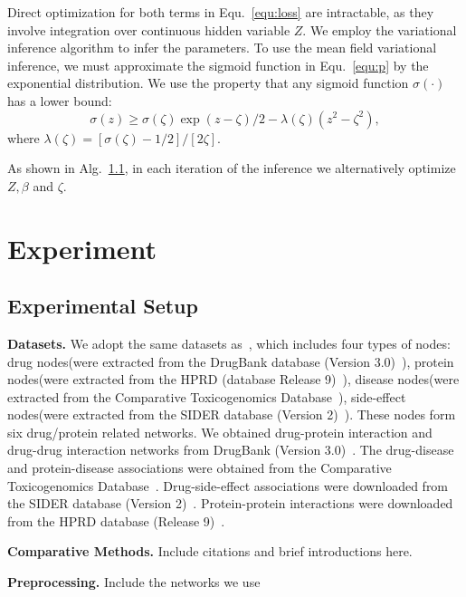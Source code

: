 \documentclass[sigconf,anonymous]{acmart}
\begin{document}
Direct optimization for both terms in Equ.~\ref{equ:loss} are intractable, as they involve integration over continuous hidden variable $Z$. We employ the variational inference algorithm to infer the parameters. To use the mean field variational inference, we must approximate the sigmoid function in Equ.~\ref{equ:p} by the exponential distribution. We use the property that any sigmoid function $\sigma(\cdot)$ has a lower bound: 
\begin{equation}
\sigma(z)\geq \sigma(\zeta)\exp{(z-\zeta)/2-\lambda(\zeta)(z^2-\zeta^2)},
\end{equation}  
where $\lambda(\zeta)=[\sigma(\zeta)-1/2]/[2\zeta]$. 

As shown in Alg.~\ref{}, in each iteration of the inference we alternatively optimize $Z,\beta$ and $\zeta$. 
\section{Experiment}\label{sec:experiment}
\subsection{Experimental Setup}

\textbf{Datasets.} %
We adopt the same datasets as~\cite{Luo2017Network}, which includes four types of nodes: drug nodes(were extracted from the DrugBank database (Version 3.0)~\cite{DrugBank}), protein nodes(were extracted from the HPRD (database Release 9)~\cite{ProteinDatabase}), disease nodes(were extracted from the Comparative Toxicogenomics Database~\cite{ToxicogenomicsDatabase}), side-effect nodes(were extracted from the SIDER database (Version 2)~\cite{SideEffect}). These nodes form six drug/protein related networks. We obtained drug-protein interaction and drug-drug interaction networks from DrugBank (Version 3.0)~\cite{DrugBank}. The drug-disease and protein-disease associations were obtained from the Comparative Toxicogenomics Database~\cite{ToxicogenomicsDatabase}. Drug-side-effect associations were downloaded from the SIDER database (Version 2)~\cite{SideEffect}. Protein-protein interactions were downloaded from the HPRD database (Release 9)~\cite{ProteinDatabase}.

\textbf{Comparative Methods.} Include citations and brief introductions here.

\textbf{Preprocessing.} Include the networks we use
\end{document}
